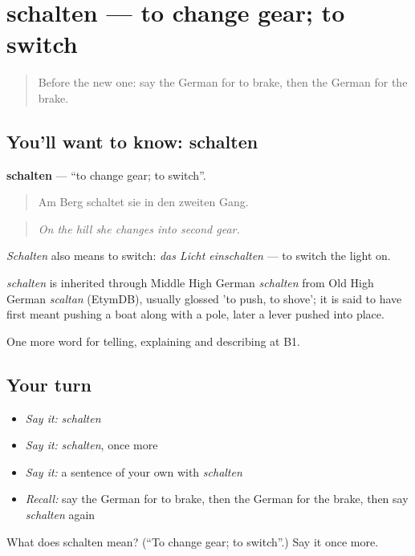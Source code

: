\section[schalten]{schalten — to change gear; to switch}

\label{lesson:GE-C399-schalten}



\begin{quote}
Before the new one: say the German for to brake, then the German for the brake.
\end{quote}

\subsection*{You'll want to know: schalten}
\textbf{schalten} — \textquotedblleft{}to change gear; to switch\textquotedblright{}.

\begin{quote}
Am Berg schaltet sie in den zweiten Gang.
\end{quote}

\begin{quote}
\emph{On the hill she changes into second gear.}
\end{quote}

\emph{Schalten} also means to switch: \emph{das Licht einschalten} — to switch the light on.

\begin{cousinweb}
\emph{schalten} is inherited through Middle High German \emph{schalten} from Old High German \emph{scaltan} (EtymDB), usually glossed 'to push, to shove'; it is said to have first meant pushing a boat along with a pole, later a lever pushed into place.
\end{cousinweb}

\begin{grammarlens}[title={What you've built}]
One more word for telling, explaining and describing at B1.
\end{grammarlens}

\subsection*{Your turn}
\begin{itemize}
\raggedright
  \item \emph{Say it:} \emph{schalten}
  \item \emph{Say it:} \emph{schalten}, once more
  \item \emph{Say it:} a sentence of your own with \emph{schalten}
  \item \emph{Recall:} say the German for to brake, then the German for the brake, then say \emph{schalten} again
\end{itemize}

\begin{tcolorbox}[breakable,colback=teal!4,colframe=teal!35!black,title={Before you move on}]
What does schalten mean? (\textquotedblleft{}To change gear; to switch\textquotedblright{}.) Say it once more.
\end{tcolorbox}
